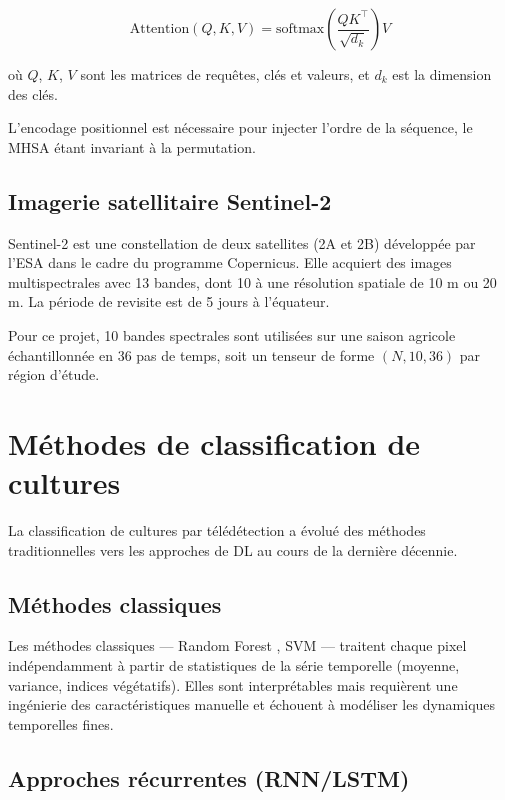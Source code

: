\begin{equation}
  \text{Attention}(Q, K, V) = \text{softmax}\!\left(\frac{QK^\top}{\sqrt{d_k}}\right) V
  \label{eq:attention}
\end{equation}

où $Q$, $K$, $V$ sont les matrices de requêtes, clés et valeurs, et $d_k$
est la dimension des clés.

L'encodage positionnel est nécessaire pour injecter l'ordre de la séquence,
le MHSA étant invariant à la permutation.

\subsection{Imagerie satellitaire Sentinel-2}

Sentinel-2 est une constellation de deux satellites (2A et 2B) développée
par l'ESA dans le cadre du programme Copernicus. Elle acquiert des images
multispectrales avec 13 bandes, dont 10 à une résolution spatiale de 10 m
ou 20 m. La période de revisite est de 5 jours à l'équateur.

Pour ce projet, 10 bandes spectrales sont utilisées sur une saison agricole
échantillonnée en 36 pas de temps, soit un tenseur de forme $(N, 10, 36)$
par région d'étude.

\section{Méthodes de classification de cultures}

La classification de cultures par télédétection a évolué des méthodes
traditionnelles vers les approches de DL au cours de la dernière décennie.

\subsection{Méthodes classiques}

Les méthodes classiques — Random Forest \cite{breiman2001}, SVM — traitent
chaque pixel indépendamment à partir de statistiques de la série temporelle
(moyenne, variance, indices végétatifs). Elles sont interprétables mais
requièrent une ingénierie des caractéristiques manuelle et échouent à
modéliser les dynamiques temporelles fines.

\subsection{Approches récurrentes (RNN/LSTM)}

